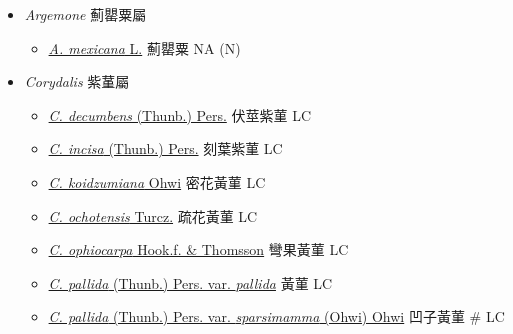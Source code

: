 
  \begin{itemize}
 \item[] \textit{Argemone} 薊罌粟屬
                                
  \begin{itemize}
        \item[] \href{http://www.theplantlist.org/tpl1.1/search?q=Argemone+mexicana}{\textit{A. mexicana} L.}   薊罌粟   NA (N)
  \end{itemize}
 \item[] \textit{Corydalis} 紫蓳屬
                                
  \begin{itemize}
        \item[] \href{http://www.theplantlist.org/tpl1.1/search?q=Corydalis+decumbens}{\textit{C. decumbens} (Thunb.) Pers.}   伏莖紫菫   LC
        \item[] \href{http://www.theplantlist.org/tpl1.1/search?q=Corydalis+incisa}{\textit{C. incisa} (Thunb.) Pers.}   刻葉紫菫   LC
        \item[] \href{http://www.theplantlist.org/tpl1.1/search?q=Corydalis+koidzumiana}{\textit{C. koidzumiana} Ohwi}   密花黃菫   LC
        \item[] \href{http://www.theplantlist.org/tpl1.1/search?q=Corydalis+ochotensis}{\textit{C. ochotensis} Turcz.}   疏花黃菫   LC
        \item[] \href{http://www.theplantlist.org/tpl1.1/search?q=Corydalis+ophiocarpa}{\textit{C. ophiocarpa} Hook.f. \& Thomsson}   彎果黃菫   LC
        \item[] \href{http://www.theplantlist.org/tpl1.1/search?q=Corydalis+pallida+var.+pallida}{\textit{C. pallida} (Thunb.) Pers. var. \textit{pallida}}   黃菫   LC
        \item[] \href{http://www.theplantlist.org/tpl1.1/search?q=Corydalis+pallida+var.+sparsimamma}{\textit{C. pallida} (Thunb.) Pers. var. \textit{sparsimamma} (Ohwi) Ohwi}   凹子黃菫  \# LC

\end{itemize}
\end{itemize}
